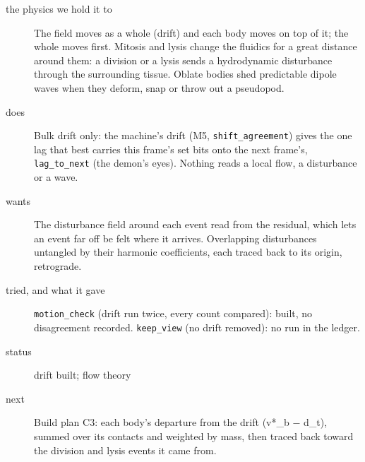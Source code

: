 \begin{description}
\item[{the physics we hold it to}] The field moves as a whole (drift) and each body moves on top of it; the whole moves first. Mitosis and lysis change the fluidics for a great distance around them: a division or a lysis sends a hydrodynamic disturbance through the surrounding tissue. Oblate bodies shed predictable dipole waves when they deform, snap or throw out a pseudopod.
\item[{does}] Bulk drift only: the machine's drift (M5, \texttt{shift\_\allowbreak{}agreement}) gives the one lag that best carries this frame's set bits onto the next frame's, \texttt{lag\_\allowbreak{}to\_\allowbreak{}next} (the demon's eyes). Nothing reads a local flow, a disturbance or a wave.
\item[{wants}] The disturbance field around each event read from the residual, which lets an event far off be felt where it arrives. Overlapping disturbances untangled by their harmonic coefficients, each traced back to its origin, retrograde.
\item[{tried, and what it gave}] \texttt{motion\_\allowbreak{}check} (drift run twice, every count compared): built, no disagreement recorded. \texttt{keep\_\allowbreak{}view} (no drift removed): no run in the ledger.
\item[{status}] drift built; flow theory
\item[{next}] Build plan C3: each body's departure from the drift (v*\_\allowbreak{}b − d\_\allowbreak{}t), summed over its contacts and weighted by mass, then traced back toward the division and lysis events it came from.
\end{description}

